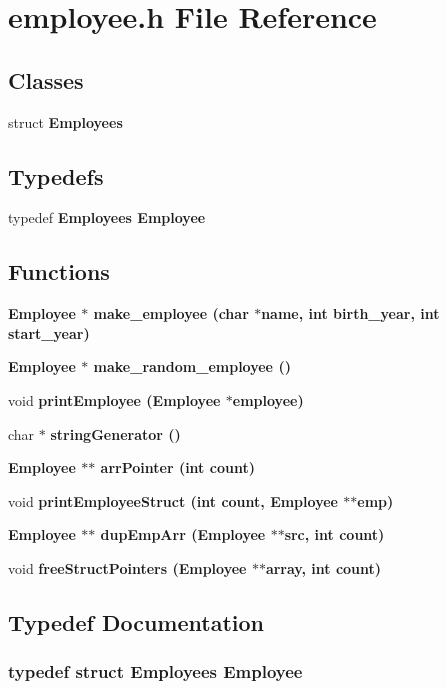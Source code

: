 \section{employee.h File Reference}
\label{employee_8h}
\subsection*{Classes}
\begin{CompactItemize}
\item 
struct \bf{Employees}
\end{CompactItemize}
\subsection*{Typedefs}
\begin{CompactItemize}
\item 
typedef \bf{Employees} \bf{Employee}
\end{CompactItemize}
\subsection*{Functions}
\begin{CompactItemize}
\item 
\bf{Employee} $\ast$ \bf{make\_\-employee} (char $\ast$name, int birth\_\-year, int start\_\-year)
\item 
\bf{Employee} $\ast$ \bf{make\_\-random\_\-employee} ()
\item 
void \bf{print\-Employee} (\bf{Employee} $\ast$employee)
\item 
char $\ast$ \bf{string\-Generator} ()
\item 
\bf{Employee} $\ast$$\ast$ \bf{arr\-Pointer} (int count)
\item 
void \bf{print\-Employee\-Struct} (int count, \bf{Employee} $\ast$$\ast$emp)
\item 
\bf{Employee} $\ast$$\ast$ \bf{dup\-Emp\-Arr} (\bf{Employee} $\ast$$\ast$src, int count)
\item 
void \bf{free\-Struct\-Pointers} (\bf{Employee} $\ast$$\ast$array, int count)
\end{CompactItemize}


\subsection{Typedef Documentation}
\subsubsection{\setlength{\rightskip}{0pt plus 5cm}typedef struct \bf{Employees}  \bf{Employee}}\label{employee_8h_91aede467e2878acfd72a7c1f8676e87}




